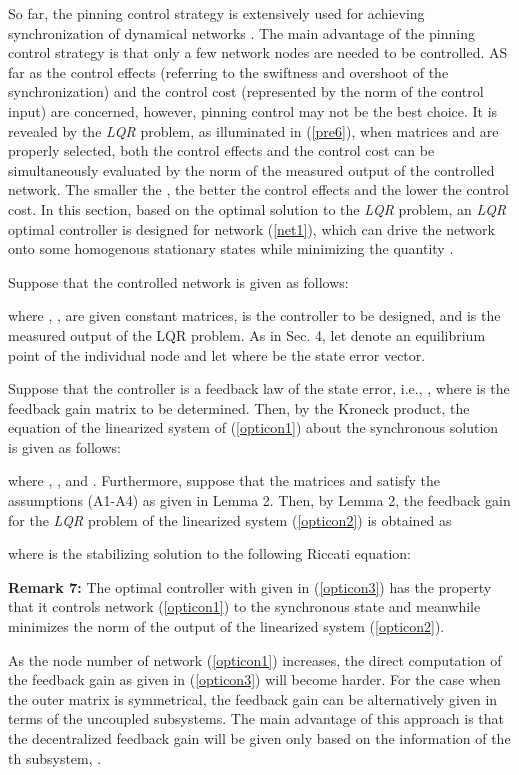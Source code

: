 \documentclass[11pt]{article}
\def\dref#1{(\ref{#1})}
\begin{document}
\quad So far, the pinning control strategy is extensively used for
 achieving synchronization of dynamical networks
\cite{li04,wang02}. The main advantage of the pinning control
strategy is that only a few network nodes are needed to be
controlled. AS far as the control effects (referring to the
swiftness and overshoot of the synchronization) and the control cost
(represented by the  norm of the control input) are concerned,
however, pinning control may not be the best choice. It is revealed
by the \textit{LQR} problem, as illuminated in \dref{pre6}, when
matrices  and  are properly selected, both the control effects
and the control cost can be simultaneously evaluated by the 
norm of the measured output  of the controlled network. The
smaller the , the better the control effects and the lower
the control cost. In this section, based on the optimal solution to
the \textit{LQR} problem, an \textit{LQR} optimal controller is
designed for network \dref{net1}, which can drive the network onto
some homogenous stationary states while minimizing the quantity
.


Suppose that the controlled network is given as follows:

where , ,
 are given constant matrices,
 is the controller to be designed, and
 is the measured output of the LQR
problem. As in Sec. 4, let  denote an equilibrium point of the
individual node and let  where
 be the state error vector.

Suppose that the controller is a feedback law of the state error,
i.e., , where  is the feedback gain matrix to be
determined. Then, by the Kroneck product, the equation of the
linearized system of \dref{opticon1} about the synchronous solution
 is given as follows:

where ,
,  and .
Furthermore, suppose that the matrices  and 
satisfy the assumptions (A1-A4) as given in Lemma 2. Then, by Lemma
2, the feedback gain  for the \textit{LQR} problem of the
linearized system \dref{opticon2} is obtained as

where  is the stabilizing solution to the following Riccati
equation:


\textbf{Remark 7:} The optimal controller  with  given
in \dref{opticon3} has the property that it controls network
\dref{opticon1} to the synchronous state  and
meanwhile minimizes the  norm of the output  of the
linearized system \dref{opticon2}.

As the node number  of network \dref{opticon1} increases, the
direct computation of the feedback gain  as given in
\dref{opticon3} will become harder. For the case when the outer
matrix  is symmetrical, the feedback gain  can be
alternatively given in terms of the  uncoupled subsystems. The
main advantage of this approach is that the decentralized feedback
gain  will be given only based on the information of the th
subsystem, .
\end{document}
